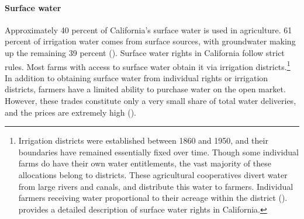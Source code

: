 \paragraph{Surface water}
Approximately 40 percent of California's surface water is used in agriculture. 61 percent of irrigation water comes from surface sources, with groundwater making up the remaining 39 percent (\textcite{cdwr2015}). Surface water rights in California follow strict rules. Most farms with access to surface water obtain it via irrigation districts.\footnote{Irrigation districts were established between 1860 and 1950, and their boundaries have remained essentially fixed over time. Though some individual farms do have their own water entitlements, the vast majority of these allocations belong to districts. These agricultural cooperatives divert water from large rivers and canals, and distribute this water to farmers. Individual farmers receiving water proportional to their acreage within the district (\textcite{schlenker2007}). \textcite{hagerty2019} provides a detailed description of surface water rights in California.} In addition to obtaining surface water from individual rights or irrigation districts, farmers have a limited ability to purchase water on the open market. However, these trades constitute only a very small share of total water deliveries, and the prices are extremely high (\textcite{hagerty2018}).

\begin{comment}

Irrigation districts obtain water through two main sources: project contracts and water rights. Project contracts allow irrigation districts to withdraw water from state- and federally-operated canals.\footnote{There are three such water projects in California: the State Water Project, the Central Valley Project, and the Lower Colorado Project. The State Water Project is managed by the California government; the other two are federally managed.} Water rights allow irrigation districts to withdraw water from nearby rivers and streams. In California, These rights are under a prior appropriation system, meaning that rights are established by the first claimant, and held as long as water is continuously used.  

Both water rights and project contracts provide irrigation districts with fixed \emph{maximum} appropriations over time, but annual allocations can vary across years. Under drought conditions, water rights are allocated according to the age of the right. Senior rightsholders, with rights established prior to 1914, are entitled to their full allocation in all years. Junior rightsholders, with rights established in and after 1914, are ranked in order of age of the right, and allocated water until the maximum allotment has been distributed. {\color{blue} WE SHOULD TRIPLE CHECK TO MAKE SURE THIS IS ACTUALLY ACCURATE.} Project contracts also vary their allocations year by year, using an algorithm which depends only on environmental conditions. {\color{blue} something about how this works by giving you a share of your max allotment.} Information on allocations is revealed to farmers well in advance of the growing season.

\end{comment}


